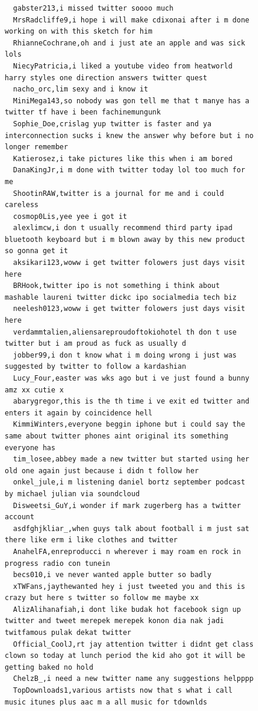 \begin{figure}[htpb]
\begin{verbatim}
  gabster213,i missed twitter soooo much
  MrsRadcliffe9,i hope i will make cdixonai after i m done working on with this sketch for him
  RhianneCochrane,oh and i just ate an apple and was sick lols
  NiecyPatricia,i liked a youtube video from heatworld harry styles one direction answers twitter quest
  nacho_orc,lim sexy and i know it
  MiniMega143,so nobody was gon tell me that t manye has a twitter tf have i been fachinemungunk
  Sophie_Doe,crislag yup twitter is faster and ya interconnection sucks i knew the answer why before but i no longer remember
  Katierosez,i take pictures like this when i am bored
  DanaKingJr,i m done with twitter today lol too much for me
  ShootinRAW,twitter is a journal for me and i could careless
  cosmop0Lis,yee yee i got it
  alexlimcw,i don t usually recommend third party ipad bluetooth keyboard but i m blown away by this new product so gonna get it
  aksikari123,woww i get twitter folowers just days visit here
  BRHook,twitter ipo is not something i think about mashable laureni twitter dickc ipo socialmedia tech biz
  neelesh0123,woww i get twitter folowers just days visit here
  verdammtalien,aliensareproudoftokiohotel th don t use twitter but i am proud as fuck as usually d
  jobber99,i don t know what i m doing wrong i just was suggested by twitter to follow a kardashian
  Lucy_Four,easter was wks ago but i ve just found a bunny amz xx cutie x
  abarygregor,this is the th time i ve exit ed twitter and enters it again by coincidence hell
  KimmiWinters,everyone beggin iphone but i could say the same about twitter phones aint original its something everyone has
  tim_losee,abbey made a new twitter but started using her old one again just because i didn t follow her
  onkel_jule,i m listening daniel bortz september podcast by michael julian via soundcloud
  Disweetsi_GuY,i wonder if mark zugerberg has a twitter account
  asdfghjkliar_,when guys talk about football i m just sat there like erm i like clothes and twitter
  AnahelFA,enreproducci n wherever i may roam en rock in progress radio con tunein
  becs010,i ve never wanted apple butter so badly
  xTWFans,jaythewanted hey i just tweeted you and this is crazy but here s twitter so follow me maybe xx
  AlizAlihanafiah,i dont like budak hot facebook sign up twitter and tweet merepek merepek konon dia nak jadi twitfamous pulak dekat twitter
  Official_CoolJ,rt jay attention twitter i didnt get class clown so today at lunch period the kid aho got it will be getting baked no hold
  ChelzB_,i need a new twitter name any suggestions helpppp
  TopDownloads1,various artists now that s what i call music itunes plus aac m a all music for tdownlds

\end{verbatim}
\end{figure}
